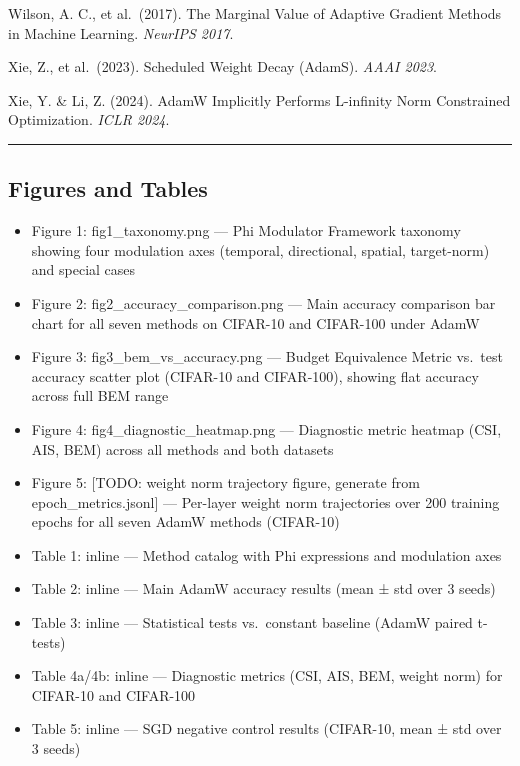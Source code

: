 \documentclass[
]{article}
\providecommand{\tightlist}{%
  \setlength{\itemsep}{0pt}\setlength{\parskip}{0pt}}
\begin{document}
Wilson, A. C., et al.~(2017). The Marginal Value of Adaptive Gradient
Methods in Machine Learning. \emph{NeurIPS 2017}.

Xie, Z., et al.~(2023). Scheduled Weight Decay (AdamS). \emph{AAAI
2023}.

Xie, Y. \& Li, Z. (2024). AdamW Implicitly Performs L-infinity Norm
Constrained Optimization. \emph{ICLR 2024}.

\begin{center}\rule{0.5\linewidth}{0.5pt}\end{center}

\hypertarget{figures-and-tables}{%
\subsection{Figures and Tables}\label{figures-and-tables}}

\begin{itemize}
\tightlist
\item
  Figure 1: fig1\_taxonomy.png --- Phi Modulator Framework taxonomy
  showing four modulation axes (temporal, directional, spatial,
  target-norm) and special cases
\item
  Figure 2: fig2\_accuracy\_comparison.png --- Main accuracy comparison
  bar chart for all seven methods on CIFAR-10 and CIFAR-100 under AdamW
\item
  Figure 3: fig3\_bem\_vs\_accuracy.png --- Budget Equivalence Metric
  vs.~test accuracy scatter plot (CIFAR-10 and CIFAR-100), showing flat
  accuracy across full BEM range
\item
  Figure 4: fig4\_diagnostic\_heatmap.png --- Diagnostic metric heatmap
  (CSI, AIS, BEM) across all methods and both datasets
\item
  Figure 5: {[}TODO: weight norm trajectory figure, generate from
  epoch\_metrics.jsonl{]} --- Per-layer weight norm trajectories over
  200 training epochs for all seven AdamW methods (CIFAR-10)
\item
  Table 1: inline --- Method catalog with Phi expressions and modulation
  axes
\item
  Table 2: inline --- Main AdamW accuracy results (mean ± std over 3
  seeds)
\item
  Table 3: inline --- Statistical tests vs.~constant baseline (AdamW
  paired t-tests)
\item
  Table 4a/4b: inline --- Diagnostic metrics (CSI, AIS, BEM, weight
  norm) for CIFAR-10 and CIFAR-100
\item
  Table 5: inline --- SGD negative control results (CIFAR-10, mean ± std
  over 3 seeds)
\end{itemize}
\end{document}
